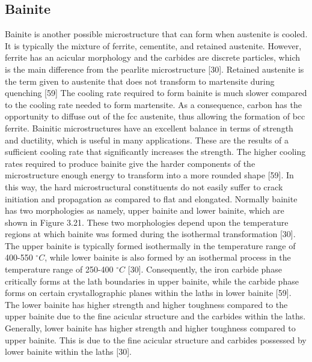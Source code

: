 \documentclass[12pt]{report}
\begin{document}
\subsection{Bainite}
Bainite is another possible microstructure that can form when austenite is cooled. It is typically the mixture of ferrite, cementite, and retained austenite. However, ferrite has an acicular morphology and the carbides are discrete particles, which is the main difference from the pearlite microstructure [30]. Retained austenite is the term given to austenite that does not transform to martensite during quenching [59] The cooling rate required to form bainite is much slower compared to the cooling rate needed to form martensite. As a consequence, carbon has the opportunity to diffuse out of the fcc austenite, thus allowing the formation of bcc ferrite.  
Bainitic microstructures have an excellent balance in terms of strength and ductility, which is useful in many applications. These are the results of a sufficient cooling rate that significantly increases the strength. The higher cooling rates required to produce bainite give the harder components of the microstructure enough energy to transform into a more rounded shape [59]. In this way, the hard microstructural constituents do not easily suffer to crack initiation and propagation as compared to flat and elongated.
Normally bainite has two morphologies as namely, upper bainite and lower bainite, which are shown in Figure 3.21. These two morphologies depend upon the temperature regions at which bainite was formed during the isothermal transformation [30]. The upper bainite is typically formed isothermally in the temperature range of 400-550 $^\circ C$, while lower bainite is also formed by an isothermal process in the temperature range of 250-400 $^\circ C$ [30]. Consequently, the iron carbide phase critically forms at the lath boundaries in upper bainite, while the carbide phase forms on certain crystallographic planes within the laths in lower bainite [59]. The lower bainite has higher strength and higher toughness compared to the upper bainite due to the fine acicular structure and the carbides within the laths. Generally, lower bainite has higher strength and higher toughness compared to upper bainite. This is due to the fine acicular structure and carbides possessed by lower bainite within the laths [30].
     
\end{document}
